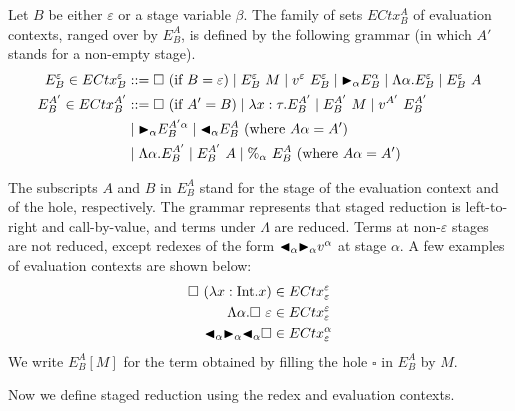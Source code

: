 \begin{definition}
    Let $B$ be either \(\varepsilon\) or a stage variable \(\beta\).
    The family of sets $ECtx^A_B$ of evaluation contexts, ranged over by $E^A_B$, is defined by the following grammar (in which $A'$ stands for a non-empty stage).
    \begin{align*}
        E^\varepsilon_B \in ECtx^\varepsilon_B & ::= \square\ (\text{if\ } B = \varepsilon)
        \mid E^\varepsilon_B\ M \mid v^\varepsilon\ E^\varepsilon_B \mid {\mathop{\blacktriangleright}}_\alpha E^\alpha_B
        \mid \Lambda\alpha.E^\varepsilon_B \mid E^\varepsilon_B\ A                                                                                    \\
        E^{A'}_B \in ECtx^{A'}_B               & ::= \square\ (\text{if } A' = B) \mid \lambda x:\tau.E^{A'}_B \mid E^{A'}_B\ M \mid v^{A'}\ E^{A'}_B \\
        & \mid {\mathop{\blacktriangleright}}_\alpha E^{A'\alpha}_B \mid {\mathop{\blacktriangleleft}}_\alpha E^{A}_B \ (\text{where } A\alpha = A')               \\
        & \mid \Lambda\alpha.E^{A'}_B \mid E^{A'}_B\ A \mid \%_\alpha\ E^{A}_B \ (\text{where } A\alpha = A')
    \end{align*}
\end{definition}

The subscripts $A$ and $B$ in $E^A_B$ stand for the stage of the evaluation
context and of the hole, respectively. The grammar represents that staged
reduction is left-to-right and call-by-value, and terms under \(\Lambda\) are
reduced. Terms at non-$\varepsilon$ stages are not reduced, except redexes of
the form \({\mathop{\blacktriangleleft}}_\alpha {\mathop{\blacktriangleright}}_\alpha v^\alpha\) at stage \(\alpha\).  A few
examples of evaluation contexts are shown below:
\begin{align*}
    \square\ (\lambda x:\textrm{Int}.x)                  & \in  ECtx^\varepsilon_\varepsilon \\
    \Lambda\alpha.\square\ \varepsilon            & \in ECtx^\varepsilon_\varepsilon  \\
    {\mathop{\blacktriangleleft}}_\alpha {\mathop{\blacktriangleright}}_\alpha {\mathop{\blacktriangleleft}}_\alpha \square & \in ECtx^\alpha_\varepsilon
\end{align*}
We write $E^A_B[M]$ for the term obtained by filling the hole $\square$ in $E^A_B$ by $M$.

Now we define staged reduction using the redex and evaluation contexts.

